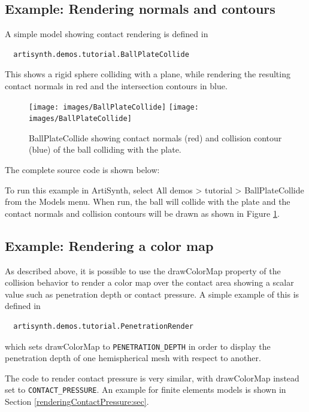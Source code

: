 \subsection{Example: Rendering normals and contours}

A simple model showing contact rendering is defined in
%
\begin{verbatim}
  artisynth.demos.tutorial.BallPlateCollide
\end{verbatim}
%
This shows a rigid sphere colliding with a plane, while
rendering the resulting contact normals in red and the
intersection contours in blue. 

\begin{figure}[ht]
\begin{center}
\iflatexml
 \texttt{[image: images/BallPlateCollide]}
\else
 \texttt{[image: images/BallPlateCollide]}
\fi
\end{center}
\caption{BallPlateCollide showing contact normals (red) and collision contour
(blue) of the ball colliding with the plate.}
\label{BallPlateCollide:fig}
\end{figure}

The complete source code is shown below:
%
\lstset{numbers=left}

\lstset{numbers=none}

To run this example in ArtiSynth, select {\sf All demos > tutorial >
BallPlateCollide} from the {\sf Models} menu. When run, the ball
will collide with the plate and the contact normals and collision 
contours will be drawn as shown in Figure \ref{BallPlateCollide:fig}.

\subsection{Example: Rendering a color map}
\label{renderingDepth:sec}

As described above, it is possible to use the {\sf drawColorMap}
property of the collision behavior to render a color map over the
contact area showing a scalar value such as penetration depth or
contact pressure. A simple example of this is defined in
%
\begin{verbatim}
  artisynth.demos.tutorial.PenetrationRender
\end{verbatim}
%
which sets {\sf drawColorMap} to {\tt PENETRATION\_DEPTH} in order to
display the penetration depth of one hemispherical mesh with respect
to another. 

\begin{sideblock}
The code to render contact pressure is very similar, with {\sf
drawColorMap} instead set to {\tt CONTACT\_PRESSURE}.  An example for
finite elements models is shown in Section
\ref{renderingContactPressure:sec}.
\end{sideblock}

